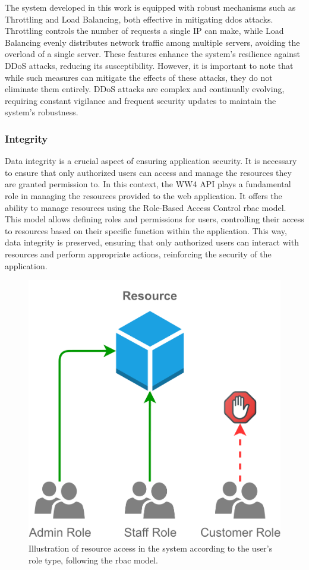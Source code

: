 The system developed in this work is equipped with robust mechanisms such as Throttling and Load Balancing, both effective in mitigating \acrshort{ddos} attacks. Throttling controls the number of requests a single IP can make, while Load Balancing evenly distributes network traffic among multiple servers, avoiding the overload of a single server. These features enhance the system's resilience against DDoS attacks, reducing its susceptibility. However, it is important to note that while such measures can mitigate the effects of these attacks, they do not eliminate them entirely. DDoS attacks are complex and continually evolving, requiring constant vigilance and frequent security updates to maintain the system's robustness.

\subsubsection{Integrity}

Data integrity is a crucial aspect of ensuring application security. It is necessary to ensure that only authorized users can access and manage the resources they are granted permission to. In this context, the WW4 API plays a fundamental role in managing the resources provided to the web application. It offers the ability to manage resources using the Role-Based Access Control \acrfull{rbac} model. This model allows defining roles and permissions for users, controlling their access to resources based on their specific function within the application. This way, data integrity is preserved, ensuring that only authorized users can interact with resources and perform appropriate actions, reinforcing the security of the application.

\begin{figure}[!ht]
    \centering
    \includegraphics[width=0.65\linewidth]{images/chap5/RBCA.pdf}
    \caption{Illustration of resource access in the system according to the user's role type, following the \acrfull{rbac} model.}
    \label{fig:RBAC}
\end{figure}


